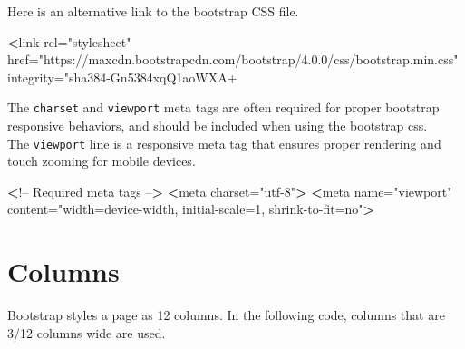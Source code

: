 \documentclass[]{book}
\newenvironment{Shaded}{\begin{snugshade}}{\end{snugshade}}
\newcommand{\StringTok}[1]{\textcolor[rgb]{0.31,0.60,0.02}{#1}}
\newcommand{\FunctionTok}[1]{\textcolor[rgb]{0.00,0.00,0.00}{#1}}
\newcommand{\OperatorTok}[1]{\textcolor[rgb]{0.81,0.36,0.00}{\textbf{#1}}}
\newcommand{\ExtensionTok}[1]{#1}
\newcommand{\NormalTok}[1]{#1}
\begin{document}
Here is an alternative link to the bootstrap CSS file.

\begin{Shaded}
\begin{Highlighting}[]
\OperatorTok{<}\FunctionTok{link}\NormalTok{ rel=}\StringTok{"stylesheet"}\NormalTok{ href=}\StringTok{"https://maxcdn.bootstrapcdn.com/bootstrap/4.0.0/css/bootstrap.min.css"}\NormalTok{ integrity=}\StringTok{"sha384-Gn5384xqQ1aoWXA+}
\end{Highlighting}
\end{Shaded}

The \texttt{charset} and \texttt{viewport} meta tags are often required
for proper bootstrap responsive behaviors, and should be included when
using the bootstrap css.\\
The \texttt{viewport} line is a responsive meta tag that ensures proper
rendering and touch zooming for mobile devices.

\begin{Shaded}
\begin{Highlighting}[]
\OperatorTok{<}\NormalTok{!}\ExtensionTok{--}\NormalTok{ Required meta tags --}\OperatorTok{>}
    \OperatorTok{<}\ExtensionTok{meta}\NormalTok{ charset=}\StringTok{"utf-8"}\OperatorTok{>}
    \OperatorTok{<}\ExtensionTok{meta}\NormalTok{ name=}\StringTok{"viewport"}\NormalTok{ content=}\StringTok{"width=device-width, initial-scale=1, shrink-to-fit=no"}\OperatorTok{>}
\end{Highlighting}
\end{Shaded}

\section{Columns}\label{columns}

Bootstrap styles a page as 12 columns. In the following code, columns
that are 3/12 columns wide are used.
\end{document}
